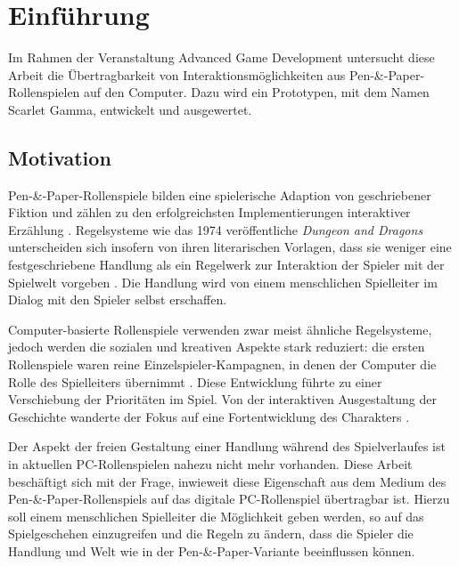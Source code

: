 \chapter{Einführung}

Im Rahmen der Veranstaltung Advanced Game Development untersucht diese Arbeit die Übertragbarkeit von Interaktionsmöglichkeiten aus Pen-\&-Paper-Rollenspielen auf den Computer. Dazu wird ein Prototypen, mit dem Namen Scarlet Gamma, entwickelt und ausgewertet.

\section{Motivation}
\label{sec:Motivation}

Pen-\&-Paper-Rollenspiele bilden eine spielerische Adaption von geschriebener Fiktion und zählen zu den erfolgreichsten Implementierungen interaktiver Erzählung \cite{Tychsen2006}. Regelsysteme wie das 1974 veröffentliche \emph{Dungeon and Dragons} unterscheiden sich insofern von ihren literarischen Vorlagen, dass sie weniger eine festgeschriebene Handlung als ein Regelwerk zur Interaktion der Spieler mit der Spielwelt vorgeben \cite{Apperley2006}. Die Handlung wird von einem menschlichen Spielleiter im Dialog mit den Spieler selbst erschaffen.

Computer-basierte Rollenspiele verwenden zwar meist ähnliche Regelsysteme, jedoch werden die sozialen und kreativen Aspekte stark reduziert: die ersten Rollenspiele waren reine Einzelspieler-Kampagnen, in denen der Computer die Rolle des Spielleiters übernimmt \cite{Apperley2006}. Diese Entwicklung führte zu einer Verschiebung der Prioritäten im Spiel. Von der interaktiven Ausgestaltung der Geschichte wanderte der Fokus auf eine Fortentwicklung des Charakters \cite{Myers2003}.

Der Aspekt der freien Gestaltung einer Handlung während des Spielverlaufes ist in aktuellen PC-Rollenspielen nahezu nicht mehr vorhanden. Diese Arbeit beschäftigt sich mit der Frage, inwieweit diese Eigenschaft aus dem Medium des Pen-\&-Paper-Rollenspiels auf das digitale PC-Rollenspiel übertragbar ist. Hierzu soll einem menschlichen Spielleiter die Möglichkeit geben werden, so auf das Spielgeschehen einzugreifen und die Regeln zu ändern, dass die Spieler die Handlung und Welt wie in der Pen-\&-Paper-Variante beeinflussen können.

